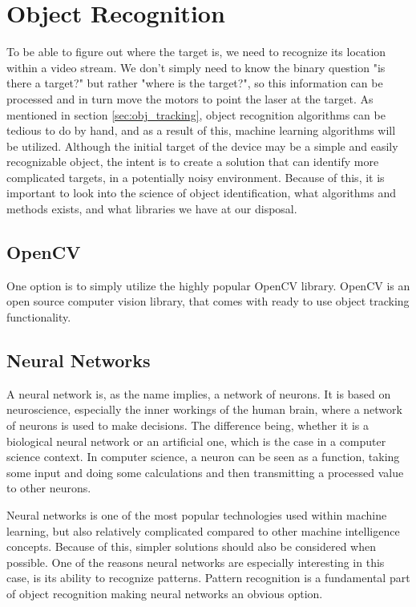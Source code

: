\section{Object Recognition}
To be able to figure out where the target is, we need to recognize its location within a video stream.
We don't simply need to know the binary question "is there a target?" but rather "where is the target?", so this information can be processed and in turn move the motors to point the laser at the target.
As mentioned in section \ref{sec:obj_tracking}, object recognition algorithms can be tedious to do by hand, and as a result of this, machine learning algorithms will be utilized.
Although the initial target of the device may be a simple and easily recognizable object, the intent is to create a solution that can identify more complicated targets, in a potentially noisy environment.
Because of this, it is important to look into the science of object identification, what algorithms and methods exists, and what libraries we have at our disposal.


\subsection{OpenCV}
One option is to simply utilize the highly popular OpenCV library.
OpenCV is an open source computer vision library, that comes with ready to use object tracking functionality.



\subsection{Neural Networks}

A neural network is, as the name implies, a network of neurons.
It is based on neuroscience, especially the inner workings of the human brain, where a network of neurons is used to make decisions.
The difference being, whether it is a biological neural network or an artificial one, which is the case in a computer science context.
In computer science, a neuron can be seen as a function, taking some input and doing some calculations and then transmitting a processed value to other neurons.

Neural networks is one of the most popular technologies used within machine learning, but also relatively complicated compared to other machine intelligence concepts.
Because of this, simpler solutions should also be considered when possible.
One of the reasons neural networks are especially interesting in this case, is its ability to recognize patterns.
Pattern recognition is a fundamental part of object recognition making neural networks an obvious option.


